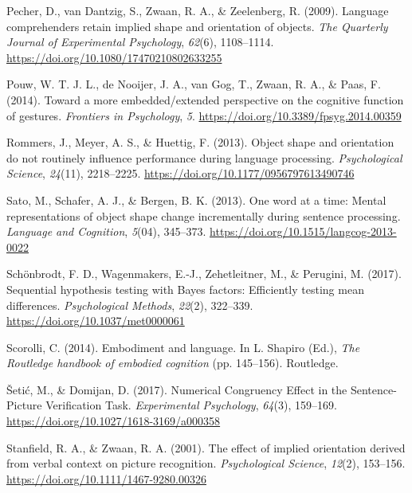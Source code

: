 \documentclass[
  man]{apa7}
\newlength{\cslhangindent}
\newlength{\cslentryspacingunit} %
\newenvironment{CSLReferences}[2] %
 {%
  \setlength{\parindent}{0pt}
  \ifodd #1
  \let\oldpar\par
  \def\par{\hangindent=\cslhangindent\oldpar}
  \fi
  \setlength{\parskip}{#2\cslentryspacingunit}
 }%
 {}
\begin{document}
\begin{CSLReferences}{1}{0}
\leavevmode{}%
Pecher, D., van Dantzig, S., Zwaan, R. A., \& Zeelenberg, R. (2009). Language comprehenders retain implied shape and orientation of objects. \emph{The Quarterly Journal of Experimental Psychology}, \emph{62}(6), 1108--1114. \url{https://doi.org/10.1080/17470210802633255}

\leavevmode{}%
Pouw, W. T. J. L., de Nooijer, J. A., van Gog, T., Zwaan, R. A., \& Paas, F. (2014). Toward a more embedded/extended perspective on the cognitive function of gestures. \emph{Frontiers in Psychology}, \emph{5}. \url{https://doi.org/10.3389/fpsyg.2014.00359}

\leavevmode{}%
Rommers, J., Meyer, A. S., \& Huettig, F. (2013). Object shape and orientation do not routinely influence performance during language processing. \emph{Psychological Science}, \emph{24}(11), 2218--2225. \url{https://doi.org/10.1177/0956797613490746}

\leavevmode{}%
Sato, M., Schafer, A. J., \& Bergen, B. K. (2013). One word at a time: {Mental} representations of object shape change incrementally during sentence processing. \emph{Language and Cognition}, \emph{5}(04), 345--373. \url{https://doi.org/10.1515/langcog-2013-0022}

\leavevmode{}%
Schönbrodt, F. D., Wagenmakers, E.-J., Zehetleitner, M., \& Perugini, M. (2017). Sequential hypothesis testing with {Bayes} factors: {Efficiently} testing mean differences. \emph{Psychological Methods}, \emph{22}(2), 322--339. \url{https://doi.org/10.1037/met0000061}

\leavevmode{}%
Scorolli, C. (2014). Embodiment and language. In L. Shapiro (Ed.), \emph{The {Routledge} handbook of embodied cognition} (pp. 145--156). {Routledge}.

\leavevmode{}%
Šetić, M., \& Domijan, D. (2017). Numerical {Congruency Effect} in the {Sentence}-{Picture Verification Task}. \emph{Experimental Psychology}, \emph{64}(3), 159--169. \url{https://doi.org/10.1027/1618-3169/a000358}

\leavevmode{}%
Stanfield, R. A., \& Zwaan, R. A. (2001). The effect of implied orientation derived from verbal context on picture recognition. \emph{Psychological Science}, \emph{12}(2), 153--156. \url{https://doi.org/10.1111/1467-9280.00326}


\end{CSLReferences}
\end{document}

